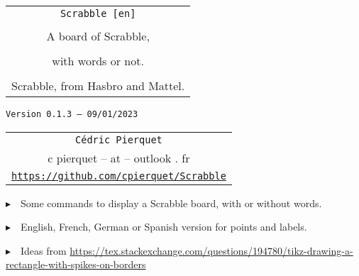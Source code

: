 \documentclass{article}
\def\TPversion{0.1.3}
\def\TPdate{09/01/2023}
\begin{document}
\pagestyle{fancy}

\thispagestyle{empty}

\vspace{2cm}

\begin{center}
	\begin{minipage}{0.75\linewidth}
	\begin{tcolorbox}[colframe=yellow,colback=yellow!15]
		\begin{center}
			\begin{tabular}{c}
				{\Huge \texttt{Scrabble [en]}}\\
				\\
				{\LARGE A board of Scrabble,} \\
				\\
				{\LARGE with words or not.} \\
				\\
				{Scrabble\texttrademark{}, from Hasbro\texttrademark{} and Mattel\texttrademark{}.}
			\end{tabular}
			
			\medskip
			
			{\small \texttt{Version \TPversion{} -- \TPdate}}
		\end{center}
	\end{tcolorbox}
\end{minipage}
\end{center}

\vspace{0.5cm}

\begin{center}
	\begin{tabular}{c}
	\texttt{Cédric Pierquet}\\
	{\ttfamily c pierquet -- at -- outlook . fr}\\
	\texttt{\url{https://github.com/cpierquet/Scrabble}}
\end{tabular}
\end{center}

\vspace{0.5cm}

{$\blacktriangleright$~~Some commands to display a Scrabble board, with or without words.}

\smallskip

{$\blacktriangleright$~~English, French, German or Spanish version for points and labels.}

\smallskip

{$\blacktriangleright$~~Ideas from \url{https://tex.stackexchange.com/questions/194780/tikz-drawing-a-rectangle-with-spikes-on-borders}}
\end{document}
